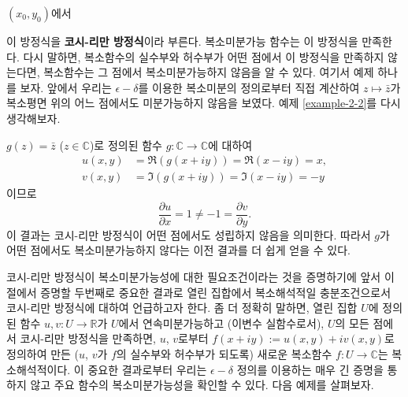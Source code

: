 \begin{center}
$(x_0, y_0)$에서 \
\tcboxmath[colback=white]{
\dfrac{\partial u}{\partial x} =  \dfrac{\partial v}{\partial y} \text{ 이고 }
\dfrac{\partial u}{\partial y} = - \dfrac{\partial v}{\partial x}.
}
\end{center}

이 방정식을 \textbf{코시-리만 방정식}이라 부른다.
복소미분가능 함수는 이 방정식을 만족한다.
다시 말하면, 복소함수의 실수부와 허수부가 어떤 점에서 이 방정식을 만족하지 않는다면,
복소함수는 그 점에서 복소미분가능하지 않음을 알 수 있다.
여기서 예제 하나를 보자. 앞에서 우리는 $\epsilon-\delta$를 이용한 복소미분의 정의로부터
직접 계산하여 $z\mapsto \bar z$가 복소평면 위의 어느 점에서도 미분가능하지 않음을 보였다.
예제 \ref{example-2-2}를 다시 생각해보자.

\begin{saltexample}[label=example-2-5]{}{}
$g(z) = \bar z$ ($z\in \mathbb C$)로 정의된 함수 $g:\mathbb C \to \mathbb C$에 대하여
\begin{align*}
u(x,y) &=\Re(g(x+iy)) = \Re(x-iy) = x, \\
v(x,y) &= \Im(g(x+iy)) = \Im(x-iy) = -y
\end{align*}
이므로
\[
\dfrac{\partial u}{\partial x} = 1 \ne -1 = \dfrac{\partial v}{\partial y}.
\]
이 결과는 코시-리만 방정식이 어떤 점에서도 성립하지 않음을 의미한다.
따라서 $g$가 어떤 점에서도 복소미분가능하지 않다는 이전 결과를 더 쉽게 얻을 수 있다.
\end{saltexample}


코시-리만 방정식이 복소미분가능성에 대한 필요조건이라는 것을 증명하기에 앞서
이 절에서 증명할 두번째로 중요한 결과로
열린 집합에서 복소해석적일 충분조건으로서
코시-리만 방정식에 대하여 언급하고자 한다.
좀 더 정확히 말하면, 
열린 집합 $U$에 정의된 함수 $u,v: U\to \mathbb R$가 
$U$에서 연속미분가능하고 (이변수 실함수로서),
$U$의 모든 점에서 코시-리만 방정식을 만족하면,
$u$, $v$로부터 $f(x+iy):=u(x,y) + iv(x,y)$로 정의하여 만든
($u$, $v$가 $f$의 실수부와 허수부가 되도록)
새로운 복소함수 $f:U\to\mathbb C$는 복소해석적이다.
이 중요한 결과로부터 우리는
$\epsilon-\delta$ 정의를 이용하는 매우 긴 증명을 통하지 않고
주요 함수의 복소미분가능성을 확인할 수 있다.
다음 예제를 살펴보자.

